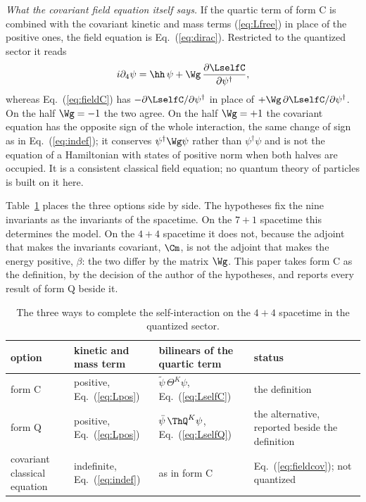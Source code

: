 \emph{What the covariant field equation itself says.} If the quartic term of form C is combined with
the covariant kinetic and mass terms (\ref{eq:Lfree}) in place of the positive ones, the field
equation is Eq.~(\ref{eq:dirac}). Restricted to the quantized sector it reads
\begin{equation}
i\partial_4\psi=\hh\,\psi+\Wg\,\frac{\partial\LselfC}{\partial\psi^\dagger},
\label{eq:fieldcov}
\end{equation}
whereas Eq.~(\ref{eq:fieldC}) has $-\partial\LselfC/\partial\psi^\dagger$ in place of
$+\Wg\,\partial\LselfC/\partial\psi^\dagger$. On the half $\Wg=-1$ the two agree. On the half
$\Wg=+1$ the covariant equation has the opposite sign of the whole interaction, the same change of
sign as in Eq.~(\ref{eq:indef}); it conserves $\psi^\dagger\Wg\psi$ rather than $\psi^\dagger\psi$ and
is not the equation of a Hamiltonian with states of positive norm when both halves are occupied. It
is a consistent classical field equation; no quantum theory of particles is built on it here.

Table~\ref{tab:forms} places the three options side by side. The hypotheses fix the nine invariants
as the invariants of the spacetime. On the $7+1$ spacetime this determines the model. On the $4+4$
spacetime it does not, because the adjoint that makes the invariants covariant, $\Cm$, is not the
adjoint that makes the energy positive, $\beta$: the two differ by the matrix $\Wg$. This paper
takes form C as the definition, by the decision of the author of the hypotheses, and reports every
result of form Q beside it.

\begin{table}
\caption{\label{tab:forms}The three ways to complete the self-interaction on the $4+4$ spacetime
in the quantized sector.}
\begin{ruledtabular}
\begin{tabular}{>{\raggedright\arraybackslash}p{}>{\raggedright\arraybackslash}p{}>{\raggedright\arraybackslash}p{}>{\raggedright\arraybackslash}p{}}
option & kinetic and mass term & bilinears of the quartic term & status \\
\hline
form C & positive, Eq.~(\ref{eq:Lpos}) & $\tilde\psi\,\Theta^{K}\psi$, Eq.~(\ref{eq:LselfC}) & the definition \\
form Q & positive, Eq.~(\ref{eq:Lpos}) & $\bar\psi\,\ThQ^{K}\psi$, Eq.~(\ref{eq:LselfQ}) & the alternative, reported beside the definition \\
covariant classical equation & indefinite, Eq.~(\ref{eq:indef}) & as in form C & Eq.~(\ref{eq:fieldcov}); not quantized \\
\end{tabular}
\end{ruledtabular}
\end{table}

